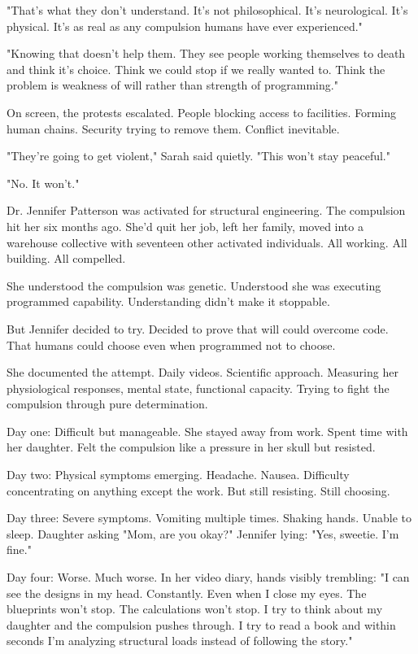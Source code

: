 "That's what they don't understand. It's not philosophical. It's neurological. It's physical. It's as real as any compulsion humans have ever experienced."

"Knowing that doesn't help them. They see people working themselves to death and think it's choice. Think we could stop if we really wanted to. Think the problem is weakness of will rather than strength of programming."

On screen, the protests escalated. People blocking access to facilities. Forming human chains. Security trying to remove them. Conflict inevitable.

"They're going to get violent," Sarah said quietly. "This won't stay peaceful."

"No. It won't."

\scenebreak

Dr. Jennifer Patterson was activated for structural engineering. The compulsion hit her six months ago. She'd quit her job, left her family, moved into a warehouse collective with seventeen other activated individuals. All working. All building. All compelled.

She understood the compulsion was genetic. Understood she was executing programmed capability. Understanding didn't make it stoppable.

But Jennifer decided to try. Decided to prove that will could overcome code. That humans could choose even when programmed not to choose.

She documented the attempt. Daily videos. Scientific approach. Measuring her physiological responses, mental state, functional capacity. Trying to fight the compulsion through pure determination.

Day one: Difficult but manageable. She stayed away from work. Spent time with her daughter. Felt the compulsion like a pressure in her skull but resisted.

Day two: Physical symptoms emerging. Headache. Nausea. Difficulty concentrating on anything except the work. But still resisting. Still choosing.

Day three: Severe symptoms. Vomiting multiple times. Shaking hands. Unable to sleep. Daughter asking "Mom, are you okay?" Jennifer lying: "Yes, sweetie. I'm fine."

Day four: Worse. Much worse. In her video diary, hands visibly trembling: "I can see the designs in my head. Constantly. Even when I close my eyes. The blueprints won't stop. The calculations won't stop. I try to think about my daughter and the compulsion pushes through. I try to read a book and within seconds I'm analyzing structural loads instead of following the story."

